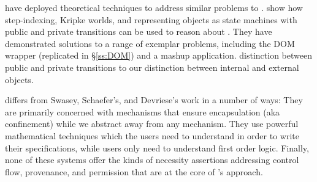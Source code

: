 \cite{dd}  have deployed
  theoretical techniques to address similar problems to \Nec.  %
   show how step-indexing, Kripke worlds, and representing objects
as state machines with public and private transitions can be used to
reason about %
.
They have demonstrated solutions to a range of exemplar problems,
including the DOM wrapper (replicated in 
\S\ref{ss:DOM}) and a mashup application.
 distinction
between public and private transitions %
 to our
distinction between internal and external objects.

 

\Nec differs from Swasey, Schaefer's, and Devriese's work in a number of ways:
They are primarily concerned with %
mechanisms that ensure encapsulation (aka 
confinement) while we abstract away from any mechanism.
They use powerful mathematical techniques
which  the users need  to understand in order to write their specifications,
while \Nec users only need  to understand  first order logic.
Finally, none of these systems offer the kinds of
necessity assertions addressing control flow, provenance, and permission that are at the core of \Nec's approach.




















